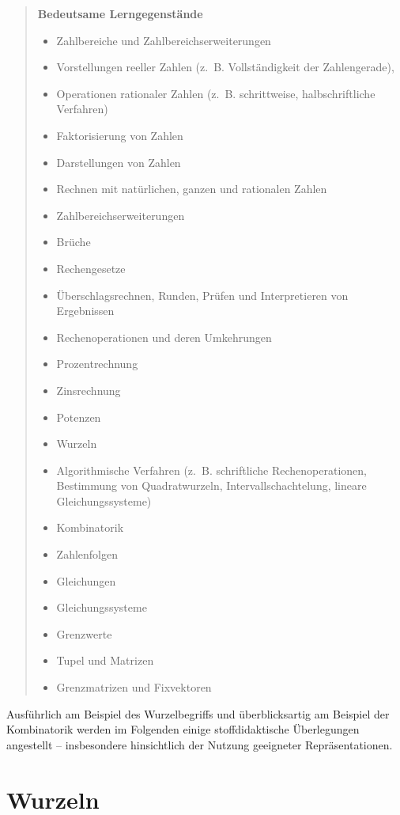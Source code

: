 \documentclass[
]{scrbook}
\providecommand{\tightlist}{%
  \setlength{\itemsep}{0pt}\setlength{\parskip}{0pt}}
\theoremstyle{definition}
\theoremstyle{definition}
\theoremstyle{definition}
\theoremstyle{definition}
\theoremstyle{remark}
\begin{document}
\begin{quote}
\textbf{Bedeutsame Lerngegenstände}

\begin{itemize}
\tightlist
\item
  Zahlbereiche und Zahlbereichserweiterungen
\item
  Vorstellungen reeller Zahlen (z.~B. Vollständigkeit der Zahlengerade),
\item
  Operationen rationaler Zahlen (z.~B. schrittweise, halbschriftliche Verfahren)
\item
  Faktorisierung von Zahlen
\item
  Darstellungen von Zahlen
\item
  Rechnen mit natürlichen, ganzen und rationalen Zahlen
\item
  Zahlbereichserweiterungen
\item
  Brüche
\item
  Rechengesetze
\item
  Überschlagsrechnen, Runden, Prüfen und Interpretieren von Ergebnissen
\item
  Rechenoperationen und deren Umkehrungen
\item
  Prozentrechnung
\item
  Zinsrechnung
\item
  Potenzen
\item
  Wurzeln
\item
  Algorithmische Verfahren (z.~B. schriftliche Rechenoperationen, Bestimmung von Quadratwurzeln, Intervallschachtelung, lineare Gleichungssysteme)
\item
  Kombinatorik
\item
  Zahlenfolgen
\item
  Gleichungen
\item
  Gleichungssysteme
\item
  Grenzwerte
\item
  Tupel und Matrizen
\item
  Grenzmatrizen und Fixvektoren
\end{itemize}
\end{quote}

Ausführlich am Beispiel des Wurzelbegriffs und überblicksartig am Beispiel der Kombinatorik werden im Folgenden einige stoffdidaktische Überlegungen angestellt -- insbesondere hinsichtlich der Nutzung geeigneter Repräsentationen.

\hypertarget{wurzeln}{%
\section{Wurzeln}\label{wurzeln}}
\end{document}
